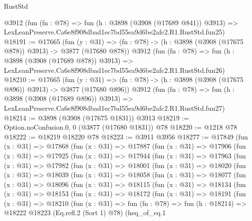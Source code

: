 \begin{lexlean}{RustStd}
\begin{coremodule}
    @3912
    (fun (fn : @78) =>
    fun (h : @3898 (@3908 (@17689 @841)) @3913) =>
    LexLeanPreserve.Ca6e8f908dbad1ec7bd55ea9d6be2afc2.R1.RustStd.fun25)
@18191 := @17665
    (fun (y : @31) => (fn : @78) -> (h : @3898 (@3908 (@17675 @878)) @3913) -> @3877 (@17680 @878))
    @3912
    (fun (fn : @78) =>
    fun (h : @3898 (@3908 (@17689 @878)) @3913) =>
    LexLeanPreserve.Ca6e8f908dbad1ec7bd55ea9d6be2afc2.R1.RustStd.fun26)
@18210 := @17665
    (fun (y : @31) => (fn : @78) -> (h : @3898 (@3908 (@17675 @896)) @3913) -> @3877 (@17680 @896))
    @3912
    (fun (fn : @78) =>
    fun (h : @3898 (@3908 (@17689 @896)) @3913) =>
    LexLeanPreserve.Ca6e8f908dbad1ec7bd55ea9d6be2afc2.R1.RustStd.fun27)
@18214 := @3898 (@3908 (@17675 @1831)) @3913
@18219 := Option.noConfusion.{0, 0} (@3877 (@17680 @1831)) @78
@18220 := @1218 @78
@18222 := @18219 @18220 @78
@18223 := @3911 @3956
@18277 := @17849
    (fun (x : @31) =>
    @17868
      (fun (x : @31) =>
      @17887
        (fun (x : @31) =>
        @17906
          (fun (x : @31) =>
          @17925
            (fun (x : @31) =>
            @17944
              (fun (x : @31) =>
              @17963
                (fun (x : @31) =>
                @17982
                  (fun (x : @31) =>
                  @18001
                    (fun (x : @31) =>
                    @18020
                      (fun (x : @31) =>
                      @18039
                        (fun (x : @31) =>
                        @18058
                          (fun (x : @31) =>
                          @18077
                            (fun (x : @31) =>
                            @18096
                              (fun (x : @31) =>
                              @18115
                                (fun (x : @31) =>
                                @18134
                                  (fun (x : @31) =>
                                  @18153
                                    (fun (x : @31) =>
                                    @18172
                                      (fun (x : @31) =>
                                      @18191
                                        (fun (x : @31) =>
                                        @18210
                                          (fun (x : @31) =>
                                          fun (fn : @78) =>
                                          fun (h : @18214) =>
                                          @18222
                                            @18223
                                            (Eq.refl.{2} (Sort 1) @78)
                                            (heq_of_eq.{1}

\end{coremodule}
\end{lexlean}
